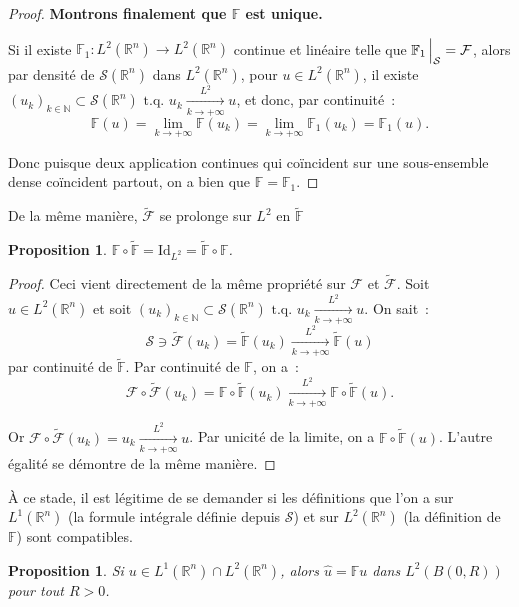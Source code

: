 \documentclass{report}
\newcommand{\R}{{\mathbb R}}
\newcommand{\N}{{\mathbb N}}
\newcommand{\tq}{\text{ t.q. }}
\newcommand{\st}{\tq}
\newcommand{\pinfty}{{+\infty}}
\newcommand{\Id}{\mathrm {Id}}
\newtheorem{prp}[thm]{Proposition}
\theoremstyle{definition}
\theoremstyle{remark}
\begin{document}
\begin{proof}
\textbf{Montrons finalement que $\mathbb F$ est unique.}

Si il existe $\mathbb F_1 : L^2(\R^n) \to L^2(\R^n)$ continue et linéaire telle que $\mathbb F_1\sVert[2]_{\mathcal S} = \mathcal F$, alors par densité de $\mathcal S(\R^n)$
dans $L^2(\R^n)$, pour $u \in L^2(\R^n)$, il existe $(u_k)_{k \in \N} \subset \mathcal S(\R^n) \tq u_k \xrightarrow[k \to \pinfty]{L^2} u$, et donc, par continuité~:
\[\mathbb F(u) = \lim_{k \to \pinfty} \mathbb F(u_k) = \lim_{k \to \pinfty} \mathbb F_1(u_k) = \mathbb F_1(u).\]

Donc puisque deux application continues qui coïncident sur une sous-ensemble dense coïncident partout, on a bien que $\mathbb F = \mathbb F_1$.
\end{proof}

De la même manière, $\tilde {\mathcal F}$ se prolonge sur $L^2$ en $\tilde {\mathbb F}$

\begin{prp} $\mathbb F \circ \tilde {\mathbb F} = \Id_{L^2} = \tilde {\mathbb F} \circ \mathbb F$.
\end{prp}

\begin{proof} Ceci vient directement de la même propriété sur $\mathcal F$ et $\tilde {\mathcal F}$. Soit $u \in L^2(\R^n)$ et soit
$(u_k)_{k \in \N} \subset \mathcal S(\R^n) \st u_k \xrightarrow[k \to \pinfty]{L^2} u$. On sait~:
\[\mathcal S \ni \tilde {\mathcal F}(u_k) = \tilde {\mathbb F}(u_k) \xrightarrow[k \to \pinfty]{L^2} \tilde {\mathbb F}(u)\]
par continuité de $\tilde {\mathbb F}$. Par continuité de $\mathbb F$, on a~:
\[\mathcal F \circ \tilde {\mathcal F}(u_k) = \mathbb F \circ \tilde {\mathbb F}(u_k) \xrightarrow[k \to \pinfty]{L^2} \mathbb F \circ \tilde {\mathbb F}(u).\]

Or $\mathcal F \circ \tilde {\mathcal F}(u_k) = u_k \xrightarrow[k \to \pinfty]{L^2} u$. Par unicité de la limite, on a $\mathbb F \circ \tilde {\mathbb F}(u)$.
L'autre égalité se démontre de la même manière.
\end{proof}

À ce stade, il est légitime de se demander si les définitions que l'on a sur $L^1(\R^n)$ (la formule intégrale définie depuis $\mathcal S$) et sur $L^2(\R^n)$
(la définition de $\mathbb F$) sont compatibles.

\begin{prp}\label{prp:Fourier L1 cap L2} Si $u \in L^1(\R^n) \cap L^2(\R^n)$, alors $\hat u = \mathbb Fu$ dans $L^2\left({B(0, R)}\right)$ pour tout $R > 0$.
\end{prp}
\end{document}
